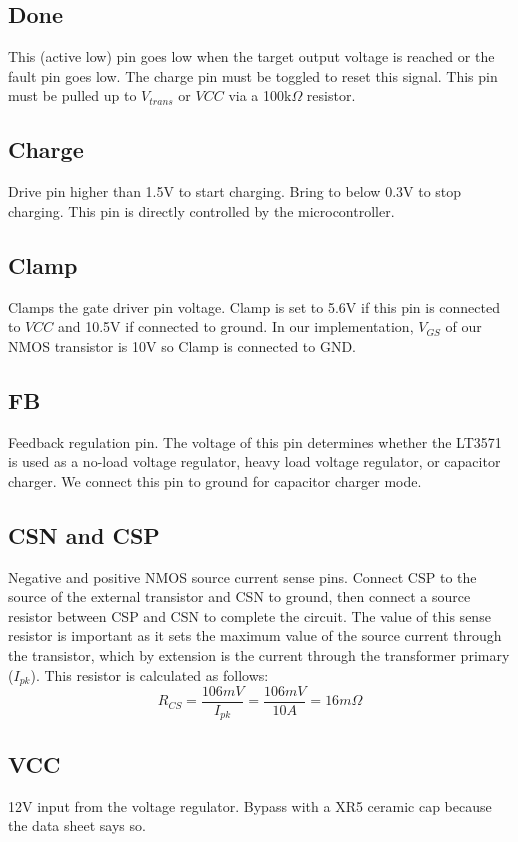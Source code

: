 \documentclass{article}
\begin{document}
	\subsection{Done}
	This (active low) pin goes low when the target output voltage is reached or the fault pin goes low. The charge pin must be toggled to reset this signal. This pin must be pulled up to $V_{trans}$ or $VCC$ via a 100k$\Omega$ resistor.
	
	\subsection{Charge}
	Drive pin higher than 1.5V to start charging. Bring to below 0.3V to stop charging. This pin is directly controlled by the microcontroller.
	
	\subsection{Clamp}
	Clamps the gate driver pin voltage. Clamp is set to 5.6V if this pin is connected to $VCC$ and 10.5V if connected to ground. In our implementation, $V_{GS}$ of our NMOS transistor is 10V so Clamp is connected to GND.
	
	\subsection{FB}
	Feedback regulation pin. The voltage of this pin determines whether the LT3571 is used as a no-load voltage regulator, heavy load voltage regulator, or capacitor charger. We connect this pin to ground for capacitor charger mode.
	
	\subsection{CSN and CSP}
	Negative and positive NMOS source current sense pins. Connect CSP to the source of the external transistor and CSN to ground, then connect a source resistor between CSP and CSN to complete the circuit. The value of this sense resistor is important as it sets the maximum value of the source current through the transistor, which by extension is the current through the transformer primary ($I_{pk}$). This resistor is calculated as follows:
	\[R_{CS} = \dfrac{106mV}{I_{pk}} = \dfrac{106mV}{10A} = 16m\Omega\]
	
	\subsection{VCC}
	12V input from the voltage regulator. Bypass with a XR5 ceramic cap because the data sheet says so.
	
\end{document}
